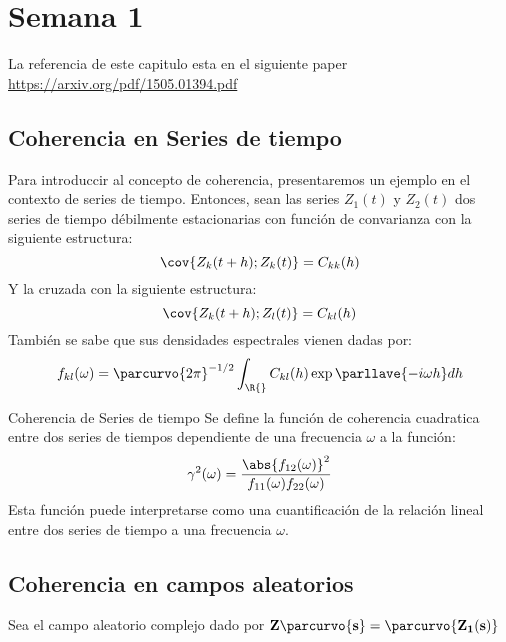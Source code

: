 \section{Semana 1}
La referencia de este capitulo esta en el siguiente paper \href{https://arxiv.org/pdf/1505.01394.pdf}{https://arxiv.org/pdf/1505.01394.pdf}
\subsection{Coherencia en Series de tiempo}
Para introduccir al concepto de coherencia, presentaremos un ejemplo en el contexto de series de tiempo. Entonces, sean las series $Z_1(t)$ y $Z_2 (t)$ dos series de tiempo débilmente estacionarias con función de convarianza con la siguiente estructura:
$$
\cov{
Z_k(t+h) ; Z_k(t)
} = C_{kk}(h)
$$
Y la cruzada con la siguiente estructura:
$$
\cov{
Z_k(t+h) ; Z_l(t)
} = C_{kl}(h)
$$
También se sabe que sus densidades espectrales vienen dadas por:
$$
f_{kl}(\omega) = \parcurvo{2\pi}^{-1/2}\int_{\R{}} C_{kl}(h)\exp\parllave{- i \omega h} dh
$$
\begin{defi}{Coherencia de Series de tiempo}
Se define la función de coherencia cuadratica entre dos series de tiempos dependiente de una frecuencia $\omega$ a la función:
$$
\gamma^2(\omega) = \dfrac{
\abs{f_{12}(\omega)}^2
}{
f_{11}(\omega) f_{22}(\omega)
}
$$
Esta función puede interpretarse como una cuantificación de la relación lineal entre dos series de tiempo a una frecuencia $\omega$.
\end{defi}
\subsection{Coherencia en campos aleatorios}
Sea el campo aleatorio complejo dado por $\bf{Z}\parcurvo{\bf{s}} = \parcurvo{ Z_1(\bf{s})}$